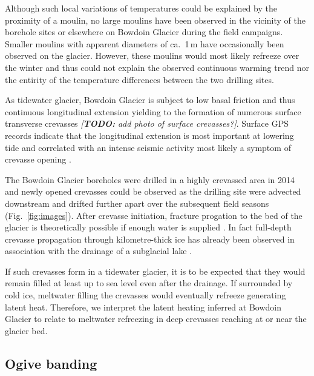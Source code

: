 \documentclass[utf8]{article}
\newcommand{\todo}[1]{\textcolor{c3}{\emph{[\textbf{TODO:} #1]}}}
\begin{document}
    Although such local variations of temperatures could be explained by the
    proximity of a moulin, no large moulins have been observed in the vicinity
    of the borehole sites or elsewhere on Bowdoin Glacier during the field
    campaigns. Smaller moulins with apparent diameters of ca.~1\,m have
    occasionally been observed on the glacier. However, these moulins would
    most likely refreeze over the winter and thus could not explain the
    observed continuous warming trend nor the entirity of the temperature
    differences between the two drilling sites.

    As tidewater glacier, Bowdoin Glacier is subject to low basal friction and
    thus continuous longitudinal extension yielding to the formation of
    numerous surface transverse crevasses \todo{add photo of surface
    crevasses?}. Surface GPS records indicate that the longitudinal
    extension is most important at lowering tide and correlated with an intense
    seismic activity most likely a symptom of crevasse opening
    \citep{Podolskiy.etal.2016, Podolskiy.etal.2017}.

    The Bowdoin Glacier boreholes were drilled in a highly crevassed area in
    2014 and newly opened crevasses could be observed as the drilling site were
    advected downstream and drifted further apart over the subsequent field
    seasons (Fig.~\ref{fig:images}). After crevasse initiation, fracture
    progation to the bed of the glacier is theoretically possible if enough
    water is supplied \citep{Veen.2007}. In fact full-depth crevasse
    propagation through kilometre-thick ice has already been observed in
    association with the drainage of a subglacial lake \citep{Das.etal.2008}.

    If such crevasses form in a tidewater glacier, it is to be expected that
    they would remain filled at least up to sea level even after the drainage.
    If surrounded by cold ice, meltwater filling the crevasses would eventually
    refreeze generating latent heat. Therefore, we interpret the latent heating
    inferred at Bowdoin Glacier to relate to meltwater refreezing in deep
    crevasses reaching at or near the glacier bed.


\subsection{Ogive banding}
\end{document}
